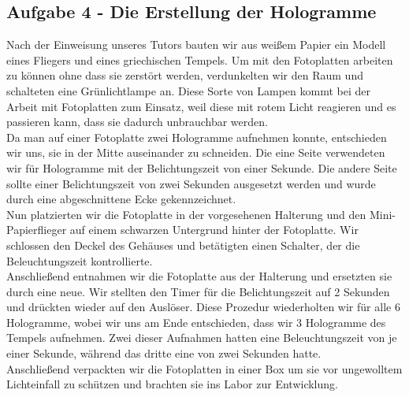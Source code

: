 \subsection*{Aufgabe 4 - Die Erstellung der Hologramme}
Nach der Einweisung unseres Tutors bauten wir aus weißem Papier ein Modell eines Fliegers und eines griechischen Tempels. 
Um mit den Fotoplatten arbeiten zu können ohne dass sie zerstört werden,  verdunkelten wir den Raum und schalteten eine Grünlichtlampe an. Diese Sorte von Lampen kommt bei der Arbeit mit Fotoplatten zum Einsatz, weil diese mit rotem Licht reagieren und es passieren kann, dass sie dadurch unbrauchbar werden.\\
Da man auf einer Fotoplatte zwei Hologramme aufnehmen konnte, entschieden wir uns, sie in der Mitte auseinander zu schneiden. Die eine Seite verwendeten wir für Hologramme mit der Belichtungszeit von einer Sekunde. Die andere Seite sollte einer Belichtungszeit von zwei Sekunden ausgesetzt werden und wurde durch eine abgeschnittene Ecke gekennzeichnet.\\
Nun platzierten wir die Fotoplatte in der vorgesehenen Halterung und den Mini-Papierflieger auf einem schwarzen Untergrund hinter der Fotoplatte. Wir schlossen den Deckel des Gehäuses und betätigten einen Schalter, der die Beleuchtungszeit kontrollierte.\\
Anschließend entnahmen wir die Fotoplatte aus der Halterung und ersetzten sie durch eine neue. Wir stellten den Timer für die Belichtungszeit auf 2 Sekunden und drückten wieder auf den Auslöser. Diese Prozedur wiederholten wir für alle 6 Hologramme, wobei wir uns am Ende entschieden, dass wir 3 Hologramme des Tempels aufnehmen. Zwei dieser Aufnahmen hatten eine Beleuchtungszeit von je einer Sekunde, während das dritte eine von zwei Sekunden hatte.\\
Anschließend verpackten wir die Fotoplatten in einer Box um sie vor ungewolltem Lichteinfall zu schützen und brachten sie ins Labor zur Entwicklung.